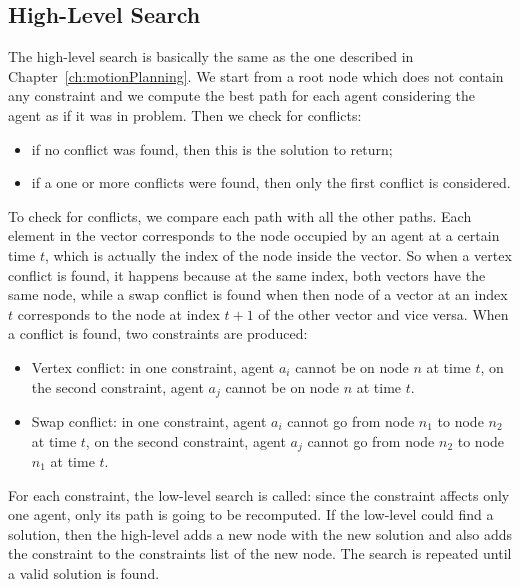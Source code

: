\subsection{High-Level Search}
The high-level search is basically the same as the one described in
Chapter~\ref{ch:motionPlanning}. We start from a root node which does not
contain any constraint and we compute the best path for each agent considering
the agent as if it was in  problem. Then we check for conflicts:
\begin{itemize}
  \item if no conflict was found, then this is the solution to return;
  \item if a one or more conflicts were found, then only the first conflict is
    considered. 
\end{itemize}
To check for conflicts, we compare each path with all the other paths. Each
element in the vector corresponds to the node occupied by an agent at a certain
time $t$, which is actually the index of the node inside the vector. So when a
vertex conflict is found, it happens because at the same index, both vectors
have the same node, while a swap conflict is found when then node of a vector
at an index $t$ corresponds to the node at index $t+1$ of the other vector and
vice versa. \newline
When a conflict is found, two constraints are produced:
\begin{itemize}
  \item Vertex conflict: in one constraint, agent $a_i$ cannot be on node $n$
    at time $t$, on the second constraint, agent $a_j$ cannot be on node $n$ at
    time $t$.
  \item Swap conflict: in one constraint, agent $a_i$ cannot go from node $n_1$
    to node $n_2$ at time $t$, on the second constraint, agent $a_j$ cannot go
    from node $n_2$ to node $n_1$ at time $t$. 
\end{itemize}
For each constraint, the low-level search is called: since the constraint
affects only one agent, only its path is going to be recomputed. If the
low-level could find a solution, then the high-level adds a new node with the
new solution and also adds the constraint to the constraints list of the new
node. The search is repeated until a valid solution is found. 
